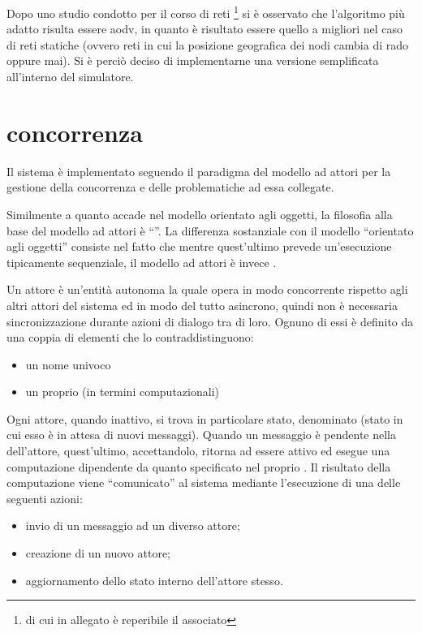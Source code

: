 Dopo uno studio condotto per il corso di reti \footnote{di cui in allegato è reperibile il  associato} si è osservato che l'algoritmo più adatto risulta essere \ac{aodv}, in quanto è risultato essere quello a  migliori nel caso di reti statiche (ovvero reti in cui la posizione geografica dei nodi cambia di rado oppure mai). Si è perciò deciso di implementarne una versione semplificata all'interno del simulatore.

\section*{concorrenza}
\label{analisi-della-soluzione-concorrenza}
Il sistema è implementato seguendo il paradigma del modello ad attori per la gestione della concorrenza e delle problematiche ad essa collegate. 

Similmente a quanto accade nel modello orientato agli oggetti, la filosofia alla base del modello ad attori è ``''. La differenza sostanziale con il modello ``orientato agli oggetti'' consiste nel fatto che mentre quest'ultimo prevede un'esecuzione tipicamente sequenziale, il modello ad attori è invece .

Un attore è un'entità autonoma la quale opera in modo concorrente rispetto agli altri attori del sistema ed in modo del tutto asincrono, quindi non è necessaria sincronizzazione durante azioni di dialogo tra di loro. Ognuno di essi è definito da una coppia di elementi che lo contraddistinguono:

\begin{itemize}
\item{un nome univoco}
\item{un proprio  (in termini computazionali)}
\end{itemize}

Ogni attore, quando inattivo, si trova in particolare stato, denominato  (stato in cui esso è in attesa di nuovi messaggi). Quando un messaggio è pendente nella  dell'attore, quest'ultimo, accettandolo, ritorna ad essere attivo ed esegue una computazione dipendente da quanto specificato nel proprio . Il risultato della computazione viene ``comunicato'' al sistema mediante l'esecuzione di una delle seguenti azioni:

\begin{itemize}
\item{invio di un messaggio ad un diverso attore;}
\item{creazione di un nuovo attore;}
\item{aggiornamento dello stato interno dell'attore stesso.}
\end{itemize}


